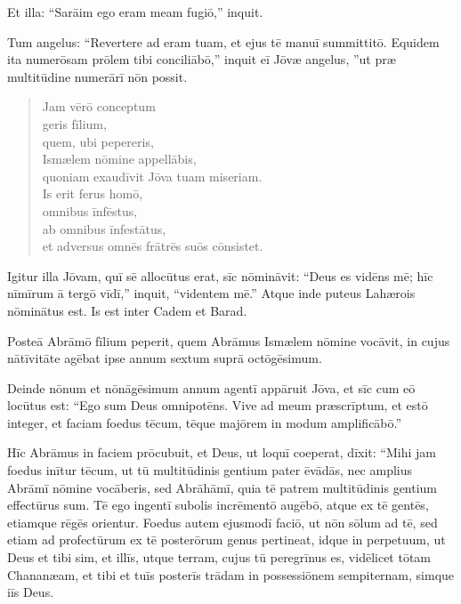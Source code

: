 Et illa: ``Sarāim ego eram meam fugiō,'' inquit.

\Versus Tum angelus: ``Revertere ad eram tuam, et ejus tē manuī summittitō.
\Versus Equidem ita numerōsam prōlem tibi conciliābō,'' inquit eī Jōvæ angelus, ''ut præ multitūdine numerārī nōn possit.

\begin{verse}
\begin{patverse*}
\Versus Jam vērō conceptum \\
geris fīlium, \\
quem, ubi pepereris, \\
Ismælem nōmine appellābis, \\
quoniam exaudīvit Jōva tuam miseriam.\\
\Versus Is erit ferus homō, \\
omnibus īnfēstus, \\
ab omnibus īnfestātus, \\
et adversus omnēs frātrēs suōs cōnsistet.
\end{patverse*}
\end{verse}

\Versus Igitur illa Jōvam, quī sē allocūtus erat, sīc nōmināvit: ``Deus es vidēns mē; hīc nīmīrum ā tergō vīdī,'' inquit, ``videntem mē.''
\Versus Atque inde puteus Lahærois nōminātus est. Is est inter Cadem et Barad.

\Versus Posteā Abrāmō fīlium peperit, quem Abrāmus Ismælem nōmine vocāvit,
\Versus in cujus nātīvitāte agēbat ipse annum sextum suprā octōgēsimum.



\Caput
\Versus Deinde nōnum et nōnāgēsimum annum agentī appāruit Jōva, et sīc cum eō locūtus est: ``Ego sum Deus omnipotēns. Vive ad meum præscrīptum, et estō integer,
\Versus et faciam foedus tēcum, tēque majōrem in modum amplificābō.''

\Versus Hīc Abrāmus in faciem prōcubuit, et Deus, ut loquī coeperat, dīxit:
\Versus ``Mihi jam foedus inītur tēcum, ut tū multitūdinis gentium pater ēvādās,
\Versus nec amplius Abrāmī nōmine vocāberis, sed Abrāhāmī, quia tē patrem multitūdinis gentium effectūrus sum.
\Versus Tē ego ingentī subolis incrēmentō augēbō, atque ex tē gentēs, etiamque rēgēs orientur.
\Versus Foedus autem ejusmodī faciō, ut nōn sōlum ad tē, sed etiam ad profectūrum ex tē posterōrum genus pertineat, idque in perpetuum, ut Deus et tibi sim, et illīs,
\Versus utque terram, cujus tū peregrīnus es, vidēlicet tōtam Chananæam, et tibi et tuīs posterīs trādam in possessiōnem sempiternam, simque iīs Deus.

